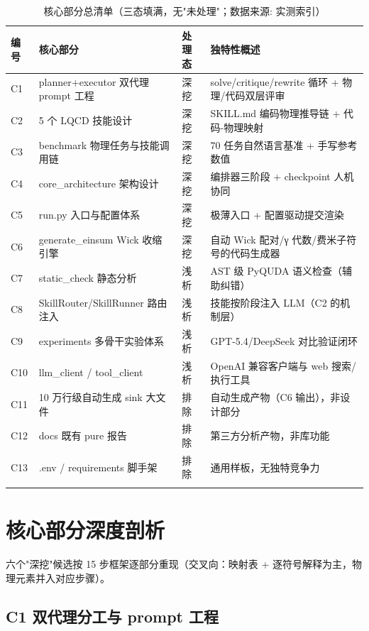\documentclass[UTF8]{ctexart}
\begin{document}
\begin{xltabular}{\textwidth}{lllX}
\toprule
\textcolor{algo}{编号} & 核心部分 & 处理态 & 独特性概述 \\
\midrule
\endhead
C1 & planner+executor 双代理 prompt 工程 & 深挖 & solve/critique/rewrite 循环 + 物理/代码双层评审 \\
C2 & 5 个 LQCD 技能设计 & 深挖 & SKILL.md 编码物理推导链 + 代码-物理映射 \\
C3 & benchmark 物理任务与技能调用链 & 深挖 & 70 任务自然语言基准 + 手写参考数值 \\
C4 & core\_architecture 架构设计 & 深挖 & 编排器三阶段 + checkpoint 人机协同 \\
C5 & run.py 入口与配置体系 & 深挖 & 极薄入口 + 配置驱动提交渲染 \\
C6 & generate\_einsum Wick 收缩引擎 & 深挖 & 自动 Wick 配对/γ 代数/费米子符号的代码生成器 \\
C7 & static\_check 静态分析 & 浅析 & AST 级 PyQUDA 语义检查（辅助纠错） \\
C8 & SkillRouter/SkillRunner 路由注入 & 浅析 & 技能按阶段注入 LLM（C2 的机制层） \\
C9 & experiments 多骨干实验体系 & 浅析 & GPT-5.4/DeepSeek 对比验证闭环 \\
C10 & llm\_client / tool\_client & 浅析 & OpenAI 兼容客户端与 web 搜索/执行工具 \\
C11 & 10 万行级自动生成 sink 大文件 & 排除 & 自动生成产物（C6 输出），非设计部分 \\
C12 & docs 既有 pure 报告 & 排除 & 第三方分析产物，非库功能 \\
C13 & .env / requirements 脚手架 & 排除 & 通用样板，无独特竞争力 \\
\bottomrule
\caption{核心部分总清单（三态填满，无"未处理"；数据来源: 实测索引）}
\end{xltabular}

\section{核心部分深度剖析}

六个"深挖"候选按 15 步框架逐部分重现（交叉向：映射表 + 逐符号解释为主，物理元素并入对应步骤）。

\subsection{C1 双代理分工与 prompt 工程}
\end{document}
